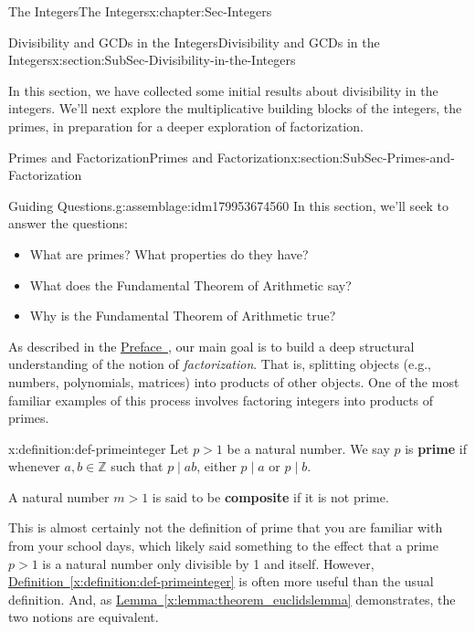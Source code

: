 \documentclass[oneside,10pt,]{book}
\newcommand{\xreffont}{\relax}
\newcommand{\terminology}[1]{\textbf{#1}}
\numberwithin{equation}{section}
\def\Z{{\mathbb Z}}
\begin{document}
\begin{chapterptx}{The Integers}{}{The Integers}{}{}{x:chapter:Sec-Integers}
\begin{sectionptx}{Divisibility and GCDs in the Integers}{}{Divisibility and GCDs in the Integers}{}{}{x:section:SubSec-Divisibility-in-the-Integers}
\begin{conclusion}{}
In this section, we have collected some initial results about divisibility in the integers. We'll next explore the multiplicative building blocks of the integers, the primes, in preparation for a deeper exploration of factorization.%
\end{conclusion}%
\end{sectionptx}
%
%
\typeout{************************************************}
\typeout{************************************************}
%
\begin{sectionptx}{Primes and Factorization}{}{Primes and Factorization}{}{}{x:section:SubSec-Primes-and-Factorization}
\begin{assemblage}{Guiding Questions.}{g:assemblage:idm179953674560}%
In this section, we'll seek to answer the questions: %
\begin{itemize}[label=\textbullet]
\item{}What are primes? What properties do they have?%
\item{}What does the Fundamental Theorem of Arithmetic say?%
\item{}Why is the Fundamental Theorem of Arithmetic true?%
\end{itemize}
%
\end{assemblage}
As described in the \hyperref[x:preface:Sec-Introduction]{Preface~}, our main goal is to build a deep structural understanding of the notion of \emph{factorization}. That is, splitting objects (e.g., numbers, polynomials, matrices) into products of other objects. One of the most familiar examples of this process involves factoring integers into products of primes.%
\begin{definition}{}{x:definition:def-primeinteger}%
%
%
Let \(p > 1\) be a natural number. We say \(p\) is \terminology{prime} if whenever \(a,b\in \Z\) such that \(p\mid ab\), either \(p\mid a\) or \(p\mid b\).%
\par
A natural number \(m > 1\) is said to be \terminology{composite} if it is not prime.%
\end{definition}
This is almost certainly not the definition of prime that you are familiar with from your school days, which likely said something to the effect that a prime \(p > 1\) is a natural number only divisible by 1 and itself. However, \hyperref[x:definition:def-primeinteger]{Definition~{\xreffont\ref{x:definition:def-primeinteger}}} is often more useful than the usual definition. And, as \hyperref[x:lemma:theorem_euclidslemma]{Lemma~{\xreffont\ref{x:lemma:theorem_euclidslemma}}} demonstrates, the two notions are equivalent.%

\end{sectionptx}
\end{chapterptx}
\end{document}
